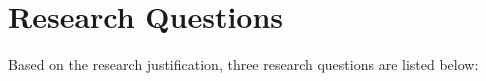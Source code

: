 \section{Research Questions}

Based on the research justification, three research questions are listed below:



